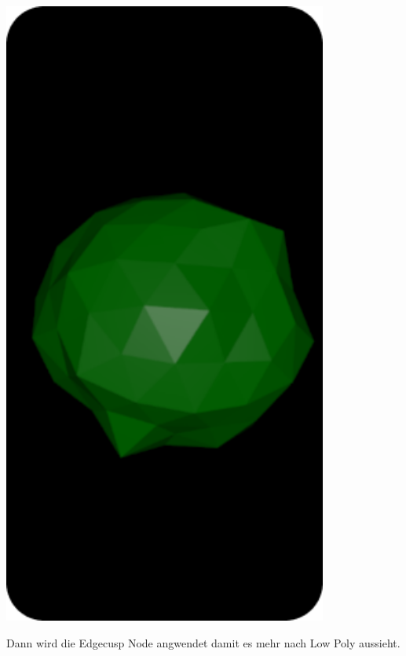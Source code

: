 \documentclass[paper=a4,fontsize=12pt,ngerman]{scrartcl}
\begin{document}
	\begin{minipage}{0.3\textwidth}
		\includegraphics[width=0.8\textwidth]{graphics/Ali9.png}
	\end{minipage}
	\begin{minipage}{0.7\textwidth}
		Dann wird die Edgecusp Node angwendet damit es mehr nach Low Poly aussieht.
	\end{minipage}
\end{document}
